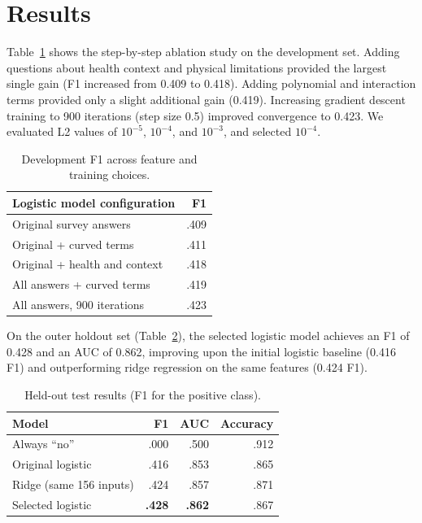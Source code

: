 \documentclass[10pt,conference,compsocconf]{latex-example-paper/IEEEtran}
\begin{document}
\section{Results}
Table~\ref{tab:steps} shows the step-by-step ablation study on the development set. Adding questions about health context and physical limitations provided the largest single gain (F1 increased from 0.409 to 0.418). Adding polynomial and interaction terms provided only a slight additional gain (0.419). Increasing gradient descent training to 900 iterations (step size 0.5) improved convergence to 0.423. We evaluated L2 values of $10^{-5}$, $10^{-4}$, and $10^{-3}$, and selected $10^{-4}$.

\begin{table}[H]
\centering
\caption{Development F1 across feature and training choices.}
\label{tab:steps}
\begin{tabular}{lr}
\toprule
Logistic model configuration & F1 \\
\midrule
Original survey answers & .409 \\
Original + curved terms & .411 \\
Original + health and context & .418 \\
All answers + curved terms & .419 \\
All answers, 900 iterations & .423 \\
\bottomrule
\end{tabular}
\end{table}

On the outer holdout set (Table~\ref{tab:holdout}), the selected logistic model achieves an F1 of 0.428 and an AUC of 0.862, improving upon the initial logistic baseline (0.416 F1) and outperforming ridge regression on the same features (0.424 F1).

\begin{table}[H]
\centering
\caption{Held-out test results (F1 for the positive class).}
\label{tab:holdout}
\begin{tabular}{lrrr}
\toprule
Model & F1 & AUC & Accuracy \\
\midrule
Always ``no'' & .000 & .500 & .912 \\
Original logistic & .416 & .853 & .865 \\
Ridge (same 156 inputs) & .424 & .857 & .871 \\
Selected logistic & \textbf{.428} & \textbf{.862} & .867 \\
\bottomrule
\end{tabular}
\end{table}
\end{document}
